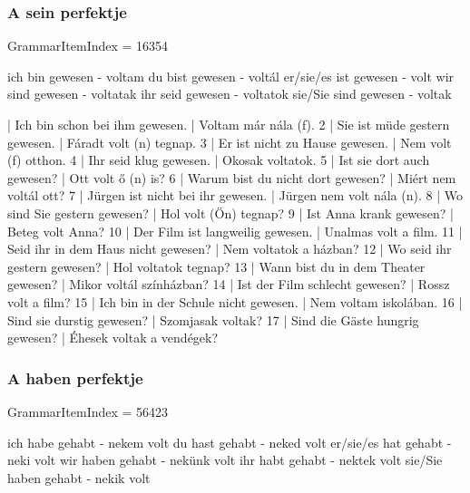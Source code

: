 \documentclass{article}
\newenvironment{desc}{\verbatim}{\endverbatim}
\newenvironment{exmp}{\verbatim}{\endverbatim}
\begin{document}
\subsubsection{A sein perfektje}

GrammarItemIndex = 16354

\begin{desc}
ich bin gewesen - voltam
du bist gewesen - voltál
er/sie/es ist gewesen - volt
wir sind gewesen - voltatak
ihr seid gewesen - voltatok
sie/Sie sind gewesen - voltak
\end{desc}

\begin{exmp}
1 | Ich bin schon bei ihm gewesen. | Voltam már nála (f).
2 | Sie ist müde gestern gewesen. | Fáradt volt (n) tegnap.
3 | Er ist nicht zu Hause gewesen. | Nem volt (f) otthon.
4 | Ihr seid klug gewesen. | Okosak voltatok.
5 | Ist sie dort auch gewesen? | Ott volt ő (n) is?
6 | Warum bist du nicht dort gewesen? | Miért nem voltál ott?
7 | Jürgen ist nicht bei ihr gewesen. | Jürgen nem volt nála (n).
8 | Wo sind Sie gestern gewesen? | Hol volt (Ön) tegnap?
9 | Ist Anna krank gewesen? | Beteg volt Anna?
10 | Der Film ist langweilig gewesen. | Unalmas volt a film.
11 | Seid ihr in dem Haus nicht gewesen? | Nem voltatok a házban?
12 | Wo seid ihr gestern gewesen? | Hol voltatok tegnap?
13 | Wann bist du in dem Theater gewesen? | Mikor voltál színházban?
14 | Ist der Film schlecht gewesen? | Rossz volt a film?
15 | Ich bin in der Schule nicht gewesen. | Nem voltam iskolában.
16 | Sind sie durstig gewesen? | Szomjasak voltak?
17 | Sind die Gäste hungrig gewesen? | Éhesek voltak a vendégek?
\end{exmp}

\subsubsection{A haben perfektje}

GrammarItemIndex = 56423

\begin{desc}

ich habe gehabt - nekem volt
du hast gehabt - neked volt
er/sie/es hat gehabt - neki volt
wir haben gehabt - nekünk volt
ihr habt gehabt - nektek volt
sie/Sie haben gehabt - nekik volt

\end{desc}

\begin{exmp}
\end{exmp}
\end{document}
